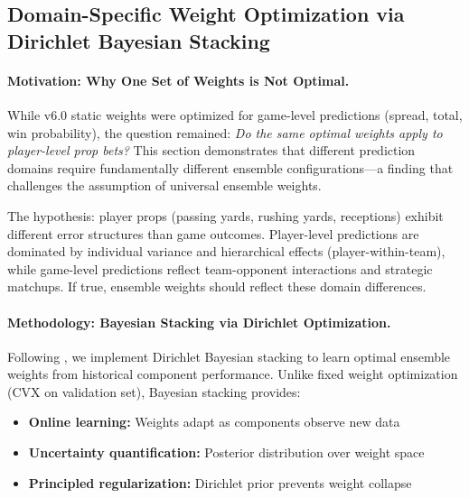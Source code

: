 \subsection{Domain-Specific Weight Optimization via Dirichlet Bayesian Stacking}
\label{subsec:domain-specific-weights}

\paragraph{Motivation: Why One Set of Weights is Not Optimal.}
While v6.0 static weights were optimized for game-level predictions (spread, total, win probability), the question remained: \textit{Do the same optimal weights apply to player-level prop bets?} This section demonstrates that different prediction domains require fundamentally different ensemble configurations—a finding that challenges the assumption of universal ensemble weights.

The hypothesis: player props (passing yards, rushing yards, receptions) exhibit different error structures than game outcomes. Player-level predictions are dominated by individual variance and hierarchical effects (player-within-team), while game-level predictions reflect team-opponent interactions and strategic matchups. If true, ensemble weights should reflect these domain differences.

\paragraph{Methodology: Bayesian Stacking via Dirichlet Optimization.}
Following \citet{yao2018stacking}, we implement Dirichlet Bayesian stacking to learn optimal ensemble weights from historical component performance. Unlike fixed weight optimization (CVX on validation set), Bayesian stacking provides:
\begin{itemize}[itemsep=2pt,parsep=0pt]
    \item \textbf{Online learning:} Weights adapt as components observe new data
    \item \textbf{Uncertainty quantification:} Posterior distribution over weight space
    \item \textbf{Principled regularization:} Dirichlet prior prevents weight collapse
\end{itemize}

